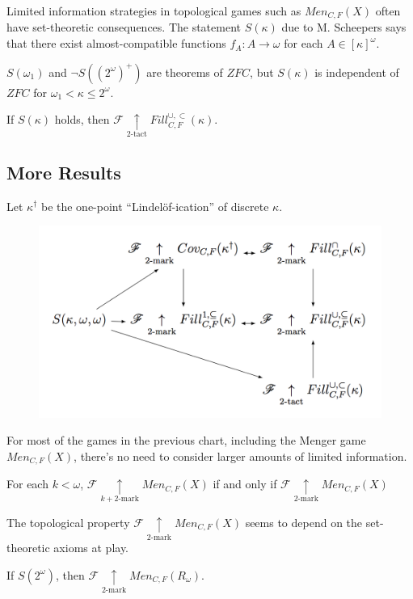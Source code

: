 \documentclass{beamer}
\theoremstyle{definition}
\newcommand{\kmarkwin}[1]{\underset{#1\text{-mark}}{\uparrow}}
\newcommand{\ktactwin}[1]{\underset{#1\text{-tact}}{\uparrow}}
\newcommand{\oneptlind}[1]{#1^\dagger}
\newcommand{\menGame}[1]{Men_{C,F}\left({#1}\right)}
\newcommand{\cloFillStrictGame}[1]{Fill^{\cup,\subset}_{C,F}\left({#1}\right)}
\newcommand{\<}{\langle}
\renewcommand{\>}{\rangle}
\newcommand{\alcompS}[1]{S(#1)}
\newcommand{\pl}[1]{\mathscr{#1}}
\begin{document}
\begin{frame}
  Limited information strategies in topological games such as
  $\menGame{X}$ often have set-theoretic
  consequences. The statement $\alcompS\kappa$ due to M. Scheepers
  \cite{MR1129143} says that there exist
  almost-compatible functions $f_A:A\to\omega$ for each $A\in[\kappa]^\omega$.

  \begin{theorem}
    $\alcompS{\omega_1}$ and $\neg\alcompS{(2^\omega)^+}$ are theorems
    of $ZFC$, but $\alcompS\kappa$ is independent of $ZFC$ for
    $\omega_1<\kappa\leq 2^\omega$.
  \end{theorem}

  \begin{theorem}
    If $\alcompS{\kappa}$ holds, then
    $\pl F\ktactwin2 \cloFillStrictGame{\kappa}$.
  \end{theorem}
\end{frame}

\subsection{More Results}

\begin{frame}
  Let $\oneptlind\kappa$ be the one-point ``Lindel\"of-ication'' of
  discrete $\kappa$.

  \begin{theorem}
    \begin{figure}
      \includegraphics[width=0.6\linewidth]{mengerGameChart.png}
    \end{figure}
  \end{theorem}
\end{frame}

\begin{frame}\small
  For most of the games in the previous chart, including the Menger game
  $\menGame{X}$, there's no need to consider larger amounts of limited
  information.

  \begin{theorem}
    For each $k<\omega$,
    $\pl F\kmarkwin{k+2}\menGame{X}$ if and only if
    $\pl F\kmarkwin2\menGame{X}$
  \end{theorem}

  The topological property $\pl F\kmarkwin2\menGame{X}$ seems to
  depend on the set-theoretic axioms at play.

  \begin{theorem}
    If $\alcompS{2^\omega}$, then $\pl F\kmarkwin2\menGame{R_\omega}$.
  \end{theorem}
\end{frame}
\end{document}
